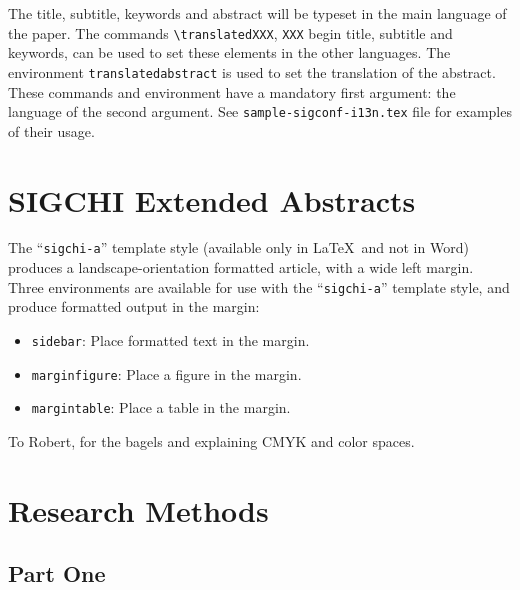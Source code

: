 The title, subtitle, keywords and abstract will be typeset in the main
language of the paper.  The commands \verb|\translatedXXX|, \verb|XXX|
begin title, subtitle and keywords, can be used to set these elements
in the other languages.  The environment \verb|translatedabstract| is
used to set the translation of the abstract.  These commands and
environment have a mandatory first argument: the language of the
second argument.  See \verb|sample-sigconf-i13n.tex| file for examples
of their usage.

\section{SIGCHI Extended Abstracts}

The ``\verb|sigchi-a|'' template style (available only in \LaTeX\ and
not in Word) produces a landscape-orientation formatted article, with
a wide left margin. Three environments are available for use with the
``\verb|sigchi-a|'' template style, and produce formatted output in
the margin:
\begin{itemize}
	\item {\verb|sidebar|}:  Place formatted text in the margin.
	\item {\verb|marginfigure|}: Place a figure in the margin.
	\item {\verb|margintable|}: Place a table in the margin.
\end{itemize}

\begin{acks}
	To Robert, for the bagels and explaining CMYK and color spaces.
\end{acks}




\appendix

\section{Research Methods}

\subsection{Part One}

